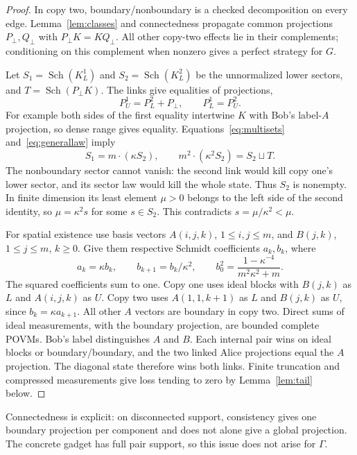 \documentclass[11pt]{article}
\theoremstyle{definition}
\DeclareMathOperator{\Sch}{Sch}
\newcommand{\sq}{\sqcup}
\newcommand{\mult}[2]{#1\mathbin{\cdot}#2}
\begin{document}
\begin{proof}
In copy two, boundary/nonboundary is a checked decomposition on every edge. Lemma~\ref{lem:classes} and connectedness propagate common projections $P_\bot,Q_\bot$ with $P_\bot K=KQ_\bot$. All other copy-two effects lie in their complements; conditioning on this complement when nonzero gives a perfect strategy for $G$.

Let $S_1=\Sch(K_L^1)$ and $S_2=\Sch(K_L^2)$ be the unnormalized lower sectors, and $T=\Sch(P_\bot K)$. The links give equalities of projections,
\begin{equation}\label{eq:projectionlinks}
P_U^1=P_L^2+P_\bot,\qquad P_L^1=P_U^2.
\end{equation}
For example both sides of the first equality intertwine $K$ with Bob's label-$A$ projection, so dense range gives equality. Equations~\eqref{eq:multisets} and~\eqref{eq:generallaw} imply
\begin{equation}\label{eq:generalchain}
S_1=\mult{m}{(\kappa S_2)},\qquad
\mult{m^2}{(\kappa^2S_2)}=S_2\sq T.
\end{equation}
The nonboundary sector cannot vanish: the second link would kill copy one's lower sector, and its sector law would kill the whole state. Thus $S_2$ is nonempty. In finite dimension its least element $\mu>0$ belongs to the left side of the second identity, so $\mu=\kappa^2s$ for some $s\in S_2$. This contradicts $s=\mu/\kappa^2<\mu$.

For spatial existence use basis vectors $A(i,j,k)$, $1\leq i,j\leq m$, and $B(j,k)$, $1\leq j\leq m$, $k\geq0$. Give them respective Schmidt coefficients $a_k,b_k$, where
\[
a_k=\kappa b_k,\qquad b_{k+1}=b_k/\kappa^2,\qquad
b_0^2=\frac{1-\kappa^{-4}}{m^2\kappa^2+m}.
\]
The squared coefficients sum to one. Copy one uses ideal blocks with $B(j,k)$ as $L$ and $A(i,j,k)$ as $U$. Copy two uses $A(1,1,k+1)$ as $L$ and $B(j,k)$ as $U$, since $b_k=\kappa a_{k+1}$. All other $A$ vectors are boundary in copy two. Direct sums of ideal measurements, with the boundary projection, are bounded complete POVMs. Bob's label distinguishes $A$ and $B$. Each internal pair wins on ideal blocks or boundary/boundary, and the two linked Alice projections equal the $A$ projection. The diagonal state therefore wins both links. Finite truncation and compressed measurements give loss tending to zero by Lemma~\ref{lem:tail} below.
\end{proof}

Connectedness is explicit: on disconnected support, consistency gives one boundary projection per component and does not alone give a global projection. The concrete gadget has full pair support, so this issue does not arise for $\Gamma$.
\end{document}
